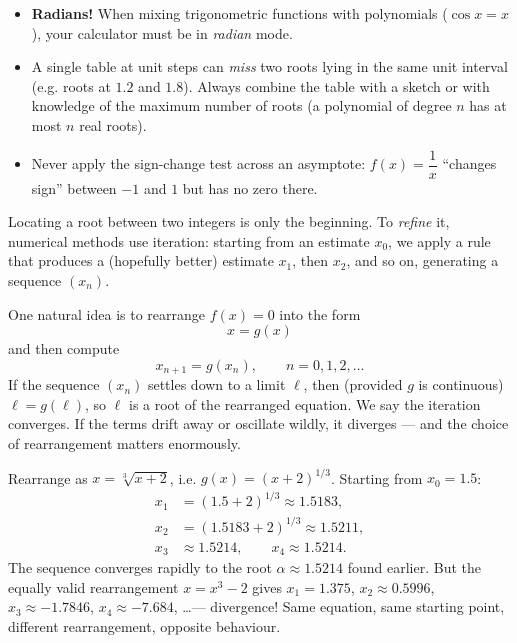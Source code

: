 \documentclass[11pt]{article}
\newcommand{\cle}[1]{{\popxbold\color{popdark}#1}}
\newcounter{popsec}
\newcounter{popsub}
\newcommand{\courssub}[1]{%
  \stepcounter{popsub}%
  \par\vspace{9pt}\noindent{\popxbold\fontsize{11.5}{13}\selectfont\color{popink}{\color{poporange}\thepopsec.\thepopsub}\hspace{6pt}#1}\par\nopagebreak\vspace{4pt}
}
\begin{document}
\begin{attention}
\begin{itemize}
\item \textbf{Radians!} When mixing trigonometric functions with polynomials ($\cos x = x$), your calculator must be in \emph{radian} mode.
\item A single table at unit steps can \emph{miss} two roots lying in the same unit interval (e.g. roots at $1.2$ and $1.8$). Always combine the table with a sketch or with knowledge of the maximum number of roots (a polynomial of degree $n$ has at most $n$ real roots).
\item Never apply the sign-change test across an asymptote: $f(x) = \dfrac{1}{x}$ ``changes sign'' between $-1$ and $1$ but has no zero there.
\end{itemize}
\end{attention}

\courssub{First Ideas of Iteration}

Locating a root between two integers is only the beginning. To \emph{refine} it, numerical methods use \cle{iteration}: starting from an estimate $x_0$, we apply a rule that produces a (hopefully better) estimate $x_1$, then $x_2$, and so on, generating a sequence $(x_n)$.

One natural idea is to rearrange $f(x) = 0$ into the form
\[ x = g(x) \]
and then compute
\[ x_{n+1} = g(x_n), \qquad n = 0, 1, 2, \ldots \]
If the sequence $(x_n)$ settles down to a limit $\ell$, then (provided $g$ is continuous) $\ell = g(\ell)$, so $\ell$ is a root of the rearranged equation. We say the iteration \cle{converges}. If the terms drift away or oscillate wildly, it \cle{diverges} — and the choice of rearrangement matters enormously.

\begin{exemplebox}[A first taste of iteration: $x^3 - x - 2 = 0$]
Rearrange as $x = \sqrt[3]{x + 2}$, i.e. $g(x) = (x+2)^{1/3}$. Starting from $x_0 = 1.5$:
\begin{align*}
x_1 &= (1.5 + 2)^{1/3} \approx 1.5183,\\
x_2 &= (1.5183 + 2)^{1/3} \approx 1.5211,\\
x_3 &\approx 1.5214, \qquad x_4 \approx 1.5214.
\end{align*}
The sequence converges rapidly to the root $\alpha \approx 1.5214$ found earlier. But the equally valid rearrangement $x = x^3 - 2$ gives $x_1 = 1.375$, $x_2 \approx 0.5996$, $x_3 \approx -1.7846$, $x_4 \approx -7.684$, \ldots — divergence! Same equation, same starting point, different rearrangement, opposite behaviour.
\end{exemplebox}
\end{document}
